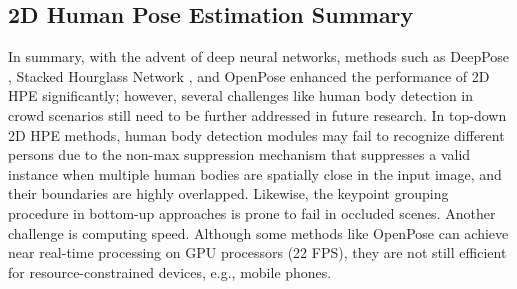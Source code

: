  
\subsection{2D Human Pose Estimation Summary}


In summary, with the advent of deep neural networks, methods such as DeepPose \cite{toshev_deeppose_2014}, Stacked Hourglass Network \cite{newell_stacked_2016}, and OpenPose \cite{cao_realtime_2017} enhanced the performance of 2D HPE significantly; however, several challenges like human body detection in crowd scenarios \cite{chen_cascaded_2018} still need to be further addressed in future research. In top-down 2D HPE methods, human body detection modules may fail to recognize different persons due to the non-max suppression mechanism that suppresses a valid instance when multiple human bodies are spatially close in the input image, and their boundaries are highly overlapped. Likewise, the keypoint grouping procedure in bottom-up approaches is prone to fail in occluded scenes. Another challenge is computing speed. Although some methods like OpenPose \cite{cao_realtime_2017} can achieve near real-time processing on GPU processors (22 FPS), they are not still efficient for resource-constrained devices, e.g., mobile phones.
